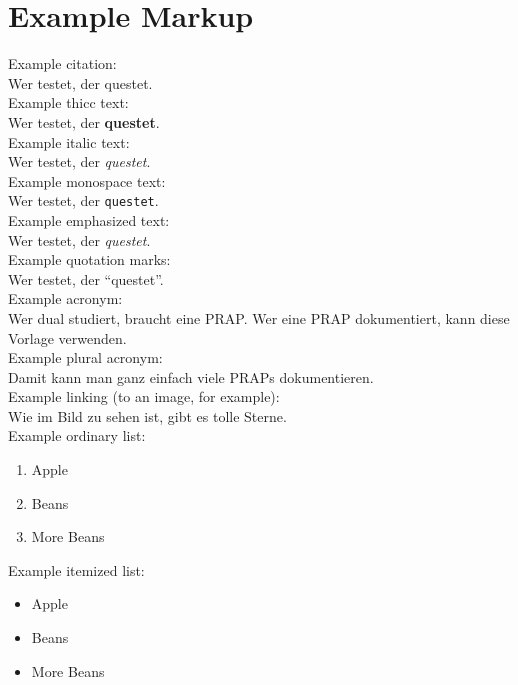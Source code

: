 %
%

\chapter{Example Markup}

Example citation:\\
Wer testet, der questet.\cite{bib:vodafone-legt-in-pirmasens}\\

Example thicc text:\\
Wer testet, der \textbf{questet}.\\

Example italic text:\\
Wer testet, der \textit{questet}.\\

Example monospace text:\\
Wer testet, der \texttt{questet}.\\

Example emphasized text:\\
Wer testet, der \emph{questet}.\\

Example quotation marks:\\
Wer testet, der \enquote{questet}.\\

Example acronym:\\
Wer dual studiert, braucht eine \ac{PRAP}. Wer eine \ac{PRAP} dokumentiert, kann diese Vorlage verwenden.\\

Example plural acronym:\\
Damit kann man ganz einfach viele \acp{PRAP} dokumentieren.\\

Example linking (to an image, for example):\\
Wie im Bild  zu sehen ist, gibt es tolle Sterne.\\

Example ordinary list:\\
\begin{enumerate}
    \item Apple
    \item Beans
    \item More Beans
\end{enumerate}

Example itemized list:\\
\begin{itemize}
    \item Apple
    \item Beans
    \item More Beans
\end{itemize}

